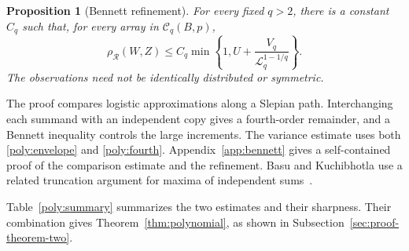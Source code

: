 \documentclass[11pt,letterpaper]{article}
\newenvironment{recovered}{\color{magenta}}{}
\newtheorem{proposition}{Proposition}
\theoremstyle{remark}
\newcommand{\rh}{\rho_{\mathcal R}}
\begin{document}
\begin{proposition}[Bennett refinement]\label{poly:bennett}
For every fixed \(q>2\), there is a constant \(C_q\) such that, for
every array in \(\mathcal C_q(B,p)\),
\begin{equation}
 \rh(W,Z)\le C_q\min\left\{1,
 U+\frac{V_q}{\mathcal{L}_q^{1-1/q}}\right\}.
 \label{poly:bennett-bound}
\end{equation}
The observations need not be identically distributed or symmetric.
\end{proposition}

\begin{recovered}
The proof compares logistic approximations along a Slepian path.
Interchanging each summand with an independent copy gives a
fourth-order remainder, and a Bennett inequality controls the large
increments. The variance estimate uses both \eqref{poly:envelope}
and \eqref{poly:fourth}. Appendix~\ref{app:bennett} gives a
self-contained proof of the comparison estimate and the refinement.
\end{recovered}
Basu and Kuchibhotla use a related truncation
argument for maxima of independent sums~\cite[Proposition~4.2]{BK2025}.

Table~\ref{poly:summary} summarizes the two estimates and their
sharpness. Their combination gives Theorem~\ref{thm:polynomial},
as shown in Subsection~\ref{sec:proof-theorem-two}.
\end{document}
